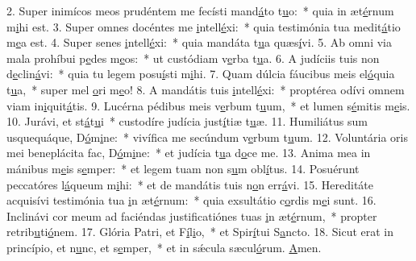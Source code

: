 2. Super inimícos meos prudéntem me fecísti mand\uline{á}to t\uline{u}o:~* quia in æt\uline{é}rnum m\uline{i}hi est.
3. Super omnes docéntes me \uline{i}ntell\uline{é}xi:~* quia testimónia tua medit\uline{á}tio m\uline{e}a est.
4. Super senes \uline{i}ntell\uline{é}xi:~* quia mandáta t\uline{u}a quæs\uline{í}vi.
5. Ab omni via mala prohíbui p\uline{e}des m\uline{e}os:~* ut custódiam v\uline{e}rba t\uline{u}a.
6. A judíciis tuis non d\uline{e}clin\uline{á}vi:~* quia tu legem posu\uline{í}sti m\uline{i}hi.
7. Quam dúlcia fáucibus meis el\uline{ó}quia t\uline{u}a,~* super mel \uline{o}ri m\uline{e}o!
8. A mandátis tuis \uline{i}ntell\uline{é}xi:~* proptérea odívi omnem viam in\uline{i}quit\uline{á}tis.
9. Lucérna pédibus meis v\uline{e}rbum t\uline{u}um,~* et lumen s\uline{é}mitis m\uline{e}is.
10. Jurávi, et st\uline{á}t\uline{u}i~* custodíre judícia just\uline{í}tiæ t\uline{u}æ.
11. Humiliátus sum usquequáque, D\uline{ó}m\uline{i}ne:~* vivífica me secúndum v\uline{e}rbum t\uline{u}um.
12. Voluntária oris mei beneplácita fac, D\uline{ó}m\uline{i}ne:~* et judícia t\uline{u}a d\uline{o}ce me.
13. Anima mea in mánibus m\uline{e}is s\uline{e}mper:~* et legem tuam non s\uline{u}m obl\uline{í}tus.
14. Posuérunt peccatóres l\uline{á}queum m\uline{i}hi:~* et de mandátis tuis n\uline{o}n err\uline{á}vi.
15. Hereditáte acquisívi testimónia tua \uline{i}n æt\uline{é}rnum:~* quia exsultátio c\uline{o}rdis m\uline{e}i sunt.
16. Inclinávi cor meum ad faciéndas justificatiónes tuas \uline{i}n æt\uline{é}rnum,~* propter retrib\uline{u}ti\uline{ó}nem.
17. Glória Patri, et F\uline{í}l\uline{i}o,~* et Spir\uline{í}tui S\uline{a}ncto.
18. Sicut erat in princípio, et n\uline{u}nc, et s\uline{e}mper,~* et in sǽcula sæcul\uline{ó}rum. \uline{A}men.

